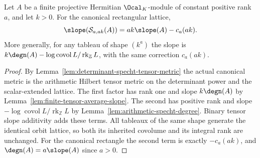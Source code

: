\begin{lemma}
\label{lem:determinant-specht-exact-slope}
\leanok
Let $A$ be a finite projective Hermitian $\Ocal_K$-module of constant
positive rank $a$, and let $k>0$. For the canonical rectangular lattice,
\[
 \slope(\mathcal S_{a,ak}(A))
   =ak\slope(A)-c_a(ak).
\]
More generally, for any tableau of shape $(k^a)$ the slope is
$k\degn(A)-\log\operatorname{covol}L/\operatorname{rk}_{\mathbb Z}L$,
with the same correction $c_a(ak)$.
\end{lemma}
\begin{proof}
By Lemma~\ref{lem:determinant-specht-tensor-metric} the actual canonical
metric is the arithmetic Hilbert tensor metric on the determinant
power and the scalar-extended lattice. The first factor has rank one
and slope $k\degn(A)$ by Lemma~\ref{lem:finite-tensor-average-slope}.
The second has positive rank and slope
$-\log\operatorname{covol}L/\operatorname{rk}_{\mathbb Z}L$ by
Lemma~\ref{lem:arithmetic-specht-degree}. Binary tensor slope additivity
adds these terms. All tableaux of the same shape generate the identical
orbit lattice, so both its inherited covolume and its integral rank are
unchanged. For the canonical rectangle the second term is
exactly $-c_a(ak)$, and $\degn(A)=a\slope(A)$ since $a>0$.
\end{proof}

